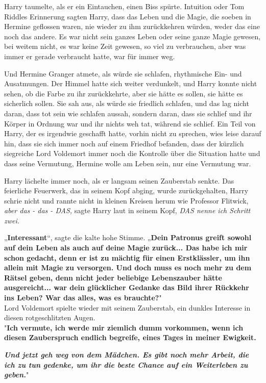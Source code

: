 {Harry taumelte, als er ein Eintauchen, einen Biss spürte. Intuition oder Tom Riddles Erinnerung sagten Harry, dass das Leben und die Magie, die soeben in Hermine geflossen waren, nie wieder zu ihm zurückkehren würden, weder das eine noch das andere. Es war nicht sein ganzes Leben oder seine ganze Magie gewesen, bei weitem nicht, es war keine Zeit gewesen, so viel zu verbrauchen, aber was immer er gerade verbraucht hatte, war für immer weg.

Und Hermine Granger atmete, als würde sie schlafen, rhythmische Ein- und Ausatmungen. Der Himmel hatte sich weiter verdunkelt, und Harry konnte nicht sehen, ob die Farbe zu ihr zurückkehrte, aber sie hätte es sollen, sie hätte es sicherlich sollen. Sie sah aus, als würde sie friedlich schlafen, und das lag nicht daran, dass tot sein wie schlafen aussah, sondern daran, dass sie schlief und ihr Körper in Ordnung war und ihr nichts weh tat, während sie schlief. Ein Teil von Harry, der es irgendwie geschafft hatte, vorhin nicht zu sprechen, wies leise darauf hin, dass sie sich immer noch auf einem Friedhof befanden, dass der kürzlich siegreiche Lord Voldemort immer noch die Kontrolle über die Situation hatte und dass seine Vermutung, Hermine wolle am Leben sein, nur eine Vermutung war.

Harry lächelte immer noch, als er langsam seinen Zauberstab senkte. Das feierliche Feuerwerk, das in seinem Kopf abging, wurde zurückgehalten, Harry schrie nicht und rannte nicht in kleinen Kreisen herum wie Professor Flitwick, \emph{aber das - das - DAS,} sagte Harry laut in seinem Kopf, \emph{DAS nenne ich Schritt zwei.}

„\textbf{Interessant}“, sagte die kalte hohe Stimme. „\textbf{Dein Patronus greift sowohl auf dein Leben als auch auf deine Magie zurück... Das habe ich mir schon gedacht, denn er ist zu mächtig für einen Erstklässler, um ihn allein mit Magie zu versorgen. Und doch muss es noch mehr zu dem Rätsel geben, denn nicht jeder beliebige Lebenszauber hätte ausgereicht... war dein glücklicher Gedanke das Bild ihrer Rückkehr ins Leben? War das alles, was es brauchte?}"\\ Lord Voldemort spielte wieder mit seinem Zauberstab, ein dunkles Interesse in diesen rotgeschlitzten Augen.\\ "\textbf{Ich vermute, ich werde mir ziemlich dumm vorkommen, wenn ich diesen Zauberspruch endlich begreife, eines Tages in meiner Ewigkeit.}

\textbf{\emph{Und jetzt geh weg von dem Mädchen. Es gibt noch mehr Arbeit, die ich zu tun gedenke, um ihr die beste Chance auf ein Weiterleben zu geben.}}"

}
